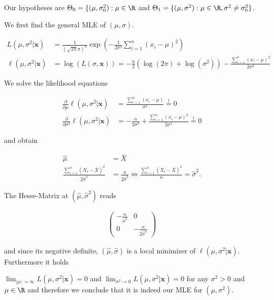 \begin{solution}

Our hypotheses are $\Theta_0 = \{(\mu, \sigma_0^2): \mu \in \R$ and
$\Theta_1 = \{(\mu, \sigma^2): \mu \in \R, \sigma^2 \neq \sigma_0^2\}$.

We first find the general MLE of $(\mu, \sigma)$.

\begin{align*}
  L(\mu, \sigma^2 | \textbf{x}) &= \frac{1}{(\sqrt{2\pi}\sigma)^n}\exp\left(-\frac{1}{2\sigma^2}\sum_{i=1}^n (x_i - \mu)^2\right) \\
  \ell(\mu, \sigma^2 | \textbf{x}) &= \log(L(\sigma,\textbf{x})) 
  = -\frac{n}{2}(\log(2\pi) + \log(\sigma^2)) - \frac{\sum_{i=1}^n (x_i - \mu)^2}{2\sigma^2}
\end{align*}

We solve the likelihood equations

\begin{align*}
  \frac{\partial}{\partial \mu} \ell(\mu, \sigma^2 | \textbf{x})
  &= \frac{\sum_{i=1}^n (x_i - \mu)}{\sigma^2} \stackrel{!}{=} 0 \\
  \frac{\partial}{\partial \sigma^2} \ell(\mu, \sigma^2 | \textbf{x})
  &= -\frac{n}{2\sigma^2} + \frac{\sum_{i=1}^n (x_i - \mu)^2}{2\sigma^4}
  \stackrel{!}{=} 0
\end{align*}

and obtain

\begin{align*}
  \hat{\mu} &= \bar{X} \\
  \frac{\sum_{i=1}^n (X_i - \bar{X})^2}{2\hat{\sigma}^4} &= \frac{n}{2\hat{\sigma}^2}
  \iff \frac{\sum_{i=1}^n (X_i - \bar{X})^2}{n} = \hat{\sigma}^2.
\end{align*}

The Hesse-Matrix at $(\hat{\mu}, \hat{\sigma}^2)$ reads

\begin{align*}
  \begin{pmatrix}
    -\frac{n}{\hat{\sigma}^2} & 0 \\
    0 & - \frac{n}{2\hat{\sigma}^4}
  \end{pmatrix}
\end{align*}

and since its negative definite, $(\hat{\mu},\hat{\sigma})$ is a local
minimizer of $\ell(\mu,\sigma^2 | \textbf{x})$.
Furthermore it holds 

$\lim_{|\mu| \to \infty} L(\mu, \sigma^2 | \textbf{x}) = 0$
and $\lim_{\sigma^2 \to 0} L(\mu, \sigma^2 | \textbf{x}) = 0$ for any $\sigma^2 > 0$ and $\mu \in \R$
and therefore we conclude that it is indeed our MLE for $(\mu,\sigma^2)$.



\end{solution}
